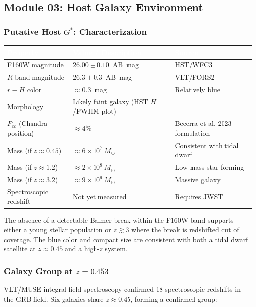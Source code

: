 \documentclass[11pt,letterpaper]{article}
\newcommand{\tableheader}[1]{\textbf{\sffamily\textcolor{white}{#1}}}
\begin{document}
\subsection{Module 03: Host Galaxy Environment}

\subsubsection{Putative Host $G^*$: Characterization}

\begin{center}
\begin{tabularx}{\textwidth}{L{4cm}XC{2.5cm}}
\toprule
{}
\tableheader{Property} & \tableheader{Value / Description} & \tableheader{Source} \\
\midrule
F160W magnitude & $26.00 \pm 0.10$~AB~mag & HST/WFC3 \\
$R$-band magnitude & $26.3 \pm 0.3$~AB~mag & VLT/FORS2 \\
$r - H$ color & $\approx 0.3$~mag & Relatively blue \\
Morphology & Likely faint galaxy (HST $H$/FWHM plot) & \\
$P_{cc}$ (Chandra position) & $\approx 4\%$ & Becerra et al. 2023 formulation \\
Mass (if $z \approx 0.45$) & $\approx 6 \times 10^7~M_\odot$ & Consistent with tidal dwarf \\
Mass (if $z \approx 1.2$) & $\approx 2 \times 10^8~M_\odot$ & Low-mass star-forming \\
Mass (if $z \approx 3.2$) & $\approx 9 \times 10^9~M_\odot$ & Massive galaxy \\
Spectroscopic redshift & Not yet measured & Requires JWST \\
\bottomrule
\end{tabularx}
\end{center}

The absence of a detectable Balmer break within the F160W band supports either a young stellar population or $z \gtrsim 3$ where the break is redshifted out of coverage. The blue color and compact size are consistent with both a tidal dwarf satellite at $z \approx 0.45$ and a high-$z$ system.

\subsubsection{Galaxy Group at $z = 0.453$}

VLT/MUSE integral-field spectroscopy confirmed 18 spectroscopic redshifts in the GRB field. Six galaxies share $z \approx 0.45$, forming a confirmed group:
\end{document}
